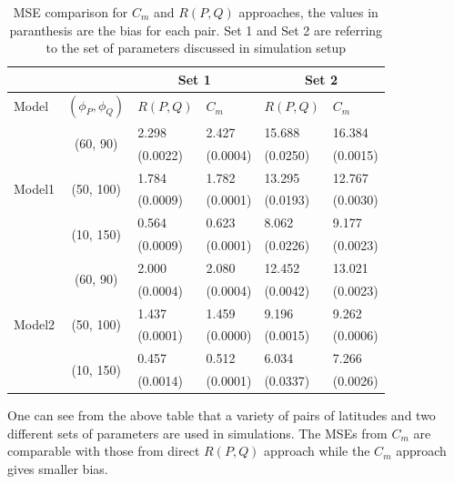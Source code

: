 \begin{table}[H]
\label{parameters}
\centering
\caption[MSE Comparison for $C_m$ and $R(P,Q)$ Approaches, the Values in Paranthesis]{MSE comparison for $C_m$ and $R(P,Q)$ approaches, the values in paranthesis are the bias for each pair.  Set 1 and Set 2 are referring to the set of parameters discussed in simulation setup}
\vskip 16pt
\begin{tabular}{|l|c|l|l|l|l|}
\hline
\multicolumn{2}{|c|}{}      & \multicolumn{2}{|c|}{Set 1} & \multicolumn{2}{|c|}{Set 2}  \\ \hline
Model & $(\phi_P, \phi_Q)$  & $R(P,Q)$  & $C_m$           & $R(P,Q)$  & $C_m$  \\ \hline
\multirow{6}{*}{Model1} & \multirow{2}{*}{(60, 90)}  & 2.298    & 2.427	  & 15.688	& 16.384	 \\
                        & &                            (0.0022) & (0.0004)& (0.0250)& (0.0015)	\\ \cline{2-6}
                        & \multirow{2}{*}{(50, 100)} & 1.784    & 1.782	  & 13.295 	& 12.767 	 \\
                        & &                            (0.0009) &(0.0001) & (0.0193)& (0.0030) 	 \\ \cline{2-6}
                        & \multirow{2}{*}{(10, 150)} & 0.564    & 0.623	  & 8.062	  & 9.177	 \\ 
                        & &                            (0.0009) &(0.0001) & (0.0226)& (0.0023)	 \\ \hline
\multirow{6}{*}{Model2} & \multirow{2}{*}{(60, 90)}  & 2.000    & 2.080	  & 12.452	& 13.021	 \\
                        & &                            (0.0004) & (0.0004)& (0.0042) & (0.0023)	\\ \cline{2-6}
                        & \multirow{2}{*}{(50, 100)} & 1.437    & 1.459	  & 9.196	  & 9.262 	 \\
                        & &                            (0.0001) &(0.0000) & (0.0015)& (0.0006) 	 \\ \cline{2-6}
                        & \multirow{2}{*}{(10, 150)} & 0.457    & 0.512	  & 6.034	  & 7.266	 \\ 
                        & &                            (0.0014) &(0.0001) & (0.0337)& (0.0026)	 \\ \hline
\end{tabular}
\end{table}

One can see from the above table that a variety of pairs of latitudes and two different sets of parameters are used in simulations. The MSEs from $C_m$ are comparable with those from direct $R(P,Q)$ approach while the $C_m$ approach gives smaller bias.



